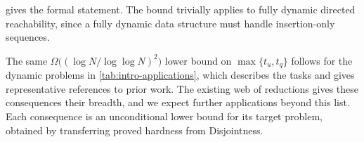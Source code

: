 \documentclass[11pt]{article}
\theoremstyle{plain}
\theoremstyle{definition}
\theoremstyle{remark}
\begin{document}
\noindent {} gives the formal statement. The bound trivially applies to fully dynamic directed reachability, since a fully dynamic data structure must handle insertion-only sequences.

The same $\Omega\big((\log N/\log\log N)^2\big)$ lower bound on $\max\{t_u,t_q\}$ follows for the dynamic problems in \cref{tab:intro-applications}, which describes the tasks and gives representative references to prior work. The existing web of reductions gives these consequences their breadth, and we expect further applications beyond this list. Each consequence is an unconditional lower bound for its target problem, obtained by transferring proved hardness from Disjointness.
\begingroup
\small
\renewcommand{\arraystretch}{1.05}
\setlength{\LTcapwidth}{\textwidth}
\setlength{\LTpre}{\smallskipamount}
\setlength{\LTpost}{\medskipamount}
\end{document}
